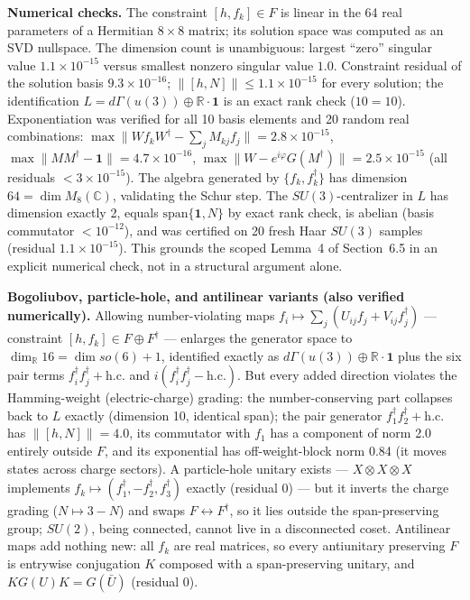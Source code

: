 \documentclass[11pt]{article}
\newcommand{\CC}{\mathbb{C}}
\newcommand{\RR}{\mathbb{R}}
\begin{document}
\textbf{Numerical checks.} The constraint $[h, f_k] \in F$ is linear in the 64 real parameters of a Hermitian $8 \times 8$ matrix; its solution space was computed as an SVD nullspace. The dimension count is unambiguous: largest ``zero'' singular value $1.1 \times 10^{-15}$ versus smallest nonzero singular value $1.0$. Constraint residual of the solution basis $9.3 \times 10^{-16}$; $\|[h, N]\| \leq 1.1 \times 10^{-15}$ for every solution; the identification $L = d\Gamma(u(3)) \oplus \RR\cdot\mathbf{1}$ is an exact rank check ($10 = 10$). Exponentiation was verified for all 10 basis elements and 20 random real combinations: $\max \|W f_k W^\dagger - \sum_j M_{kj} f_j\| = 2.8 \times 10^{-15}$, $\max \|MM^\dagger - \mathbf{1}\| = 4.7 \times 10^{-16}$, $\max \|W - e^{i\varphi}G(M^\dagger)\| = 2.5 \times 10^{-15}$ (all residuals $< 3 \times 10^{-15}$). The algebra generated by $\{f_k, f_k^\dagger\}$ has dimension $64 = \dim M_8(\CC)$, validating the Schur step. The $SU(3)$-centralizer in $L$ has dimension exactly 2, equals $\mathrm{span}\{\mathbf{1}, N\}$ by exact rank check, is abelian (basis commutator $< 10^{-12}$), and was certified on 20 fresh Haar $SU(3)$ samples (residual $1.1 \times 10^{-15}$). This grounds the scoped Lemma~4 of Section~6.5 in an explicit numerical check, not in a structural argument alone.

\textbf{Bogoliubov, particle-hole, and antilinear variants (also verified numerically).} Allowing number-violating maps $f_i \mapsto \sum_j (U_{ij} f_j + V_{ij} f_j^\dagger)$ --- constraint $[h, f_k] \in F \oplus F^\dagger$ --- enlarges the generator space to $\dim_\RR 16 = \dim so(6) + 1$, identified exactly as $d\Gamma(u(3)) \oplus \RR\cdot\mathbf{1}$ plus the six pair terms $f_i^\dagger f_j^\dagger + \mathrm{h.c.}$ and $i(f_i^\dagger f_j^\dagger - \mathrm{h.c.})$. But every added direction violates the Hamming-weight (electric-charge) grading: the number-conserving part collapses back to $L$ exactly (dimension 10, identical span); the pair generator $f_1^\dagger f_2^\dagger + \mathrm{h.c.}$ has $\|[h, N]\| = 4.0$, its commutator with $f_1$ has a component of norm 2.0 entirely outside $F$, and its exponential has off-weight-block norm 0.84 (it moves states across charge sectors). A particle-hole unitary exists --- $X \otimes X \otimes X$ implements $f_k \mapsto (f_1^\dagger, -f_2^\dagger, f_3^\dagger)$ exactly (residual 0) --- but it inverts the charge grading ($N \mapsto 3 - N$) and swaps $F \leftrightarrow F^\dagger$, so it lies outside the span-preserving group; $SU(2)$, being connected, cannot live in a disconnected coset. Antilinear maps add nothing new: all $f_k$ are real matrices, so every antiunitary preserving $F$ is entrywise conjugation $K$ composed with a span-preserving unitary, and $K G(U) K = G(\bar U)$ (residual 0).
\end{document}
